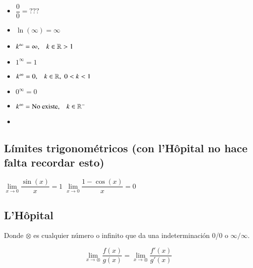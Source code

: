 \begin{multicols}{2}
\begin{itemize}
\item $\dfrac{0}{0} = ???$

\item $\ln (\infty) = \infty$

\item $k^\infty = \infty, \;\;\;k\in\mathbb{R}>1$

\item $1^\infty = 1$

\item $k^\infty = 0, \;\;\;k\in\mathbb{R},\; 0<k<1$

\item $0^\infty = 0$

\item $k^\infty =  \text{No existe}, \;\;\;k\in\mathbb{R}^-$
\item[]
\end{itemize}
\end{multicols}

\subsection{Límites trigonométricos (con l'Hôpital no hace falta recordar esto)}

\hfil
$\lim\limits_{x\rightarrow 0} \dfrac{\sin(x)}{x} = 1$
\hfil
$\lim\limits_{x\rightarrow 0} \dfrac{1 - \cos(x)}{x} = 0$
\hfil

\subsection{L'Hôpital}

Donde $\otimes$ es cualquier número o infinito que da una indeterminación 0/0 o $\infty/\infty$.

$$\lim\limits_{x\rightarrow \otimes}\dfrac{f(x)}{g(x)}=
\lim\limits_{x\rightarrow \otimes}\dfrac{f'(x)}{g'(x)}$$
